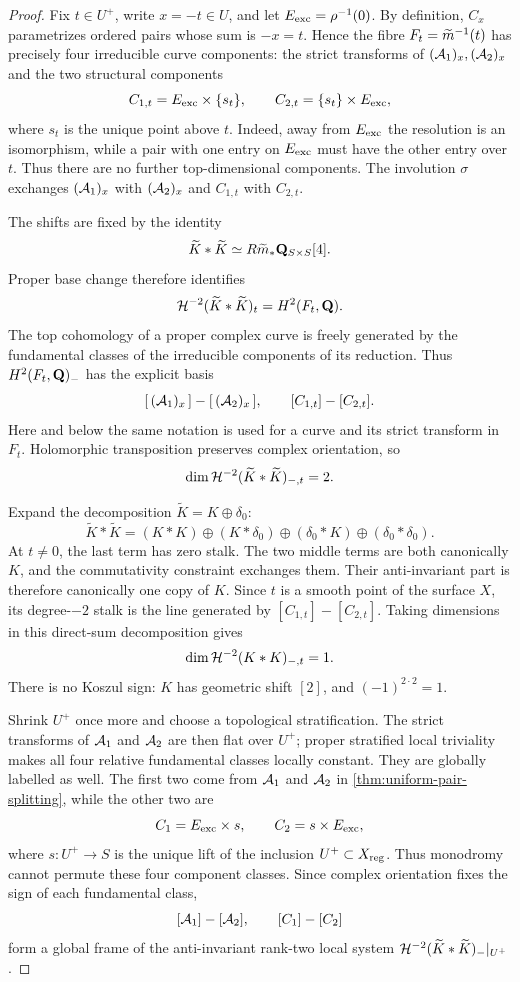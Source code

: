 \begin{proof}
Fix $t\in U^+$, write $x=-t\in U$, and let
$E_{\mathrm{exc}}=\rho^{-1}(0)$.  By definition, $C_x$ parametrizes ordered pairs
whose sum is $-x=t$.  Hence the fibre
$F_t=\widetilde m^{-1}(t)$ has precisely four irreducible curve components: the
strict transforms of $(\mathcal A_1)_x,(\mathcal A_2)_x$ and the two structural components
\[
 C_{1,t}=E_{\mathrm{exc}}\times\{s_t\},
 \qquad
 C_{2,t}=\{s_t\}\times E_{\mathrm{exc}},
\]
where $s_t$ is the unique point above $t$.  Indeed, away from
$E_{\mathrm{exc}}$ the resolution is an isomorphism, while a pair with one entry on
$E_{\mathrm{exc}}$ must have the other entry over $t$.  Thus there are no further
top-dimensional components.  The involution $\sigma$ exchanges
$(\mathcal A_1)_x$ with $(\mathcal A_2)_x$ and $C_{1,t}$ with $C_{2,t}$.

The shifts are fixed by the identity
\[
 \widetilde K*\widetilde K
 \simeq R\widetilde m_*\mathbf Q_{S\times S}[4].
\]
Proper base change therefore identifies
\[
 \mathcal H^{-2}(\widetilde K*\widetilde K)_t=H^2(F_t,\mathbf Q).
\]
The top cohomology of a proper complex curve is freely generated by the
fundamental classes of the irreducible components of its reduction.  Thus
$H^2(F_t,\mathbf Q)_-$ has the explicit basis
\[
 [\,(\mathcal A_1)_x\,]-[\,(\mathcal A_2)_x\,],
 \qquad [C_{1,t}]-[C_{2,t}].
\]
Here and below the same notation is used for a curve and its strict transform
in $F_t$.  Holomorphic transposition preserves complex orientation, so
\begin{equation}
 \dim\mathcal H^{-2}(\widetilde K*\widetilde K)_{-,t}=2.
\label{eq:total-alt-rank}
\end{equation}

Expand the decomposition $\widetilde K=K\oplus\delta_0$:
\[
 \widetilde K*\widetilde K=(K*K)\oplus(K*\delta_0)\oplus(\delta_0*K)
      \oplus(\delta_0*\delta_0).
\]
At $t\ne0$, the last term has zero stalk.  The two middle terms are both
canonically $K$, and the commutativity constraint exchanges them.  Their
anti-invariant part is therefore canonically one copy of $K$.  Since $t$ is
a smooth point of the surface $X$, its degree-$-2$ stalk is the line
generated by $[C_{1,t}]-[C_{2,t}]$.  Taking dimensions in this direct-sum
decomposition gives
\begin{equation}
 \dim\mathcal H^{-2}(K*K)_{-,t}=1.
\label{eq:principal-alt-rank}
\end{equation}
There is no Koszul sign: $K$ has geometric shift $[2]$, and
$(-1)^{2\cdot2}=1$.

Shrink $U^+$ once more and choose a topological stratification.  The strict
transforms of $\mathcal A_1$ and $\mathcal A_2$ are then flat over $U^+$; proper
stratified local triviality makes all four relative fundamental classes
locally constant.  They are globally labelled as well.  The first two come
from $\mathcal A_1$ and $\mathcal A_2$ in \cref{thm:uniform-pair-splitting}, while the
other two are
\[
 C_1=E_{\mathrm{exc}}\times s,\qquad C_2=s\times E_{\mathrm{exc}},
\]
where $s:U^+\to S$ is the unique lift of the inclusion $U^+\subset X_{\mathrm{reg}}$.
Thus monodromy cannot permute these four component classes.  Since complex
orientation fixes the sign of each fundamental class,
\[
 [\mathcal A_1]-[\mathcal A_2],\qquad [C_1]-[C_2]
\]
form a global frame of the anti-invariant rank-two local system
$\mathcal H^{-2}(\widetilde K*\widetilde K)_-|_{U^+}$.


\end{proof}
